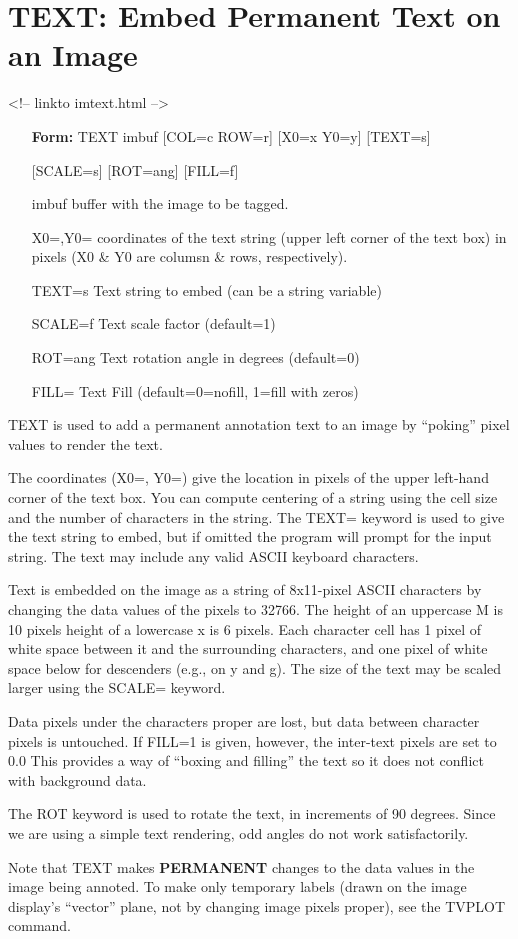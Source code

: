 \section{TEXT: Embed Permanent Text on an Image}
\begin{rawhtml}
<!-- linkto imtext.html -->
\end{rawhtml}
\begin{itemize}
  \item[\textbf{Form: }TEXT  imbuf {[COL=c ROW=r]} {[X0=x Y0=y]} 
       {[TEXT=s]}\hfill]{}
  \item[]{{[SCALE=s]} {[ROT=ang]} {[FILL=f]}}
  \item[imbuf]{   buffer with the image to be tagged.}
  \item[X0=,Y0=]{coordinates of the text string (upper left corner of
       the text box) in pixels (X0 \& Y0 are columsn \& rows, respectively).}
  \item[TEXT=s]{Text string to embed (can be a string variable)}
  \item[SCALE=f]{Text scale factor (default=1)}
  \item[ROT=ang]{Text rotation angle in degrees (default=0)}
  \item[FILL=]  {Text Fill (default=0=nofill, 1=fill with zeros)}
\end{itemize}

TEXT is used to add a permanent annotation text to an image by ``poking''
pixel values to render the text.

The coordinates (X0=, Y0=) give the location in pixels of the upper
left-hand corner of the text box.  You can compute centering of a string
using the cell size and the number of characters in the string.  The TEXT=
keyword is used to give the text string to embed, but if omitted the
program will prompt for the input string.  The text may include any valid
ASCII keyboard characters.

Text is embedded on the image as a string of 8x11-pixel ASCII characters by
changing the data values of the pixels to 32766.  The height of an
uppercase M is 10 pixels height of a lowercase x is 6 pixels.  Each
character cell has 1 pixel of white space between it and the surrounding
characters, and one pixel of white space below for descenders (e.g., on y
and g).  The size of the text may be scaled larger using the SCALE=
keyword.

Data pixels under the characters proper are lost, but data between
character pixels is untouched.  If FILL=1 is given, however, the inter-text
pixels are set to 0.0 This provides a way of ``boxing and filling'' the
text so it does not conflict with background data.

The ROT keyword is used to rotate the text, in increments of 90 degrees.
Since we are using a simple text rendering, odd angles do not work
satisfactorily.

Note that TEXT makes \textbf{PERMANENT} changes to the data values in the
image being annoted.   To make only temporary labels (drawn on the image
display's ``vector'' plane, not by changing image pixels proper), see the
TVPLOT command.

